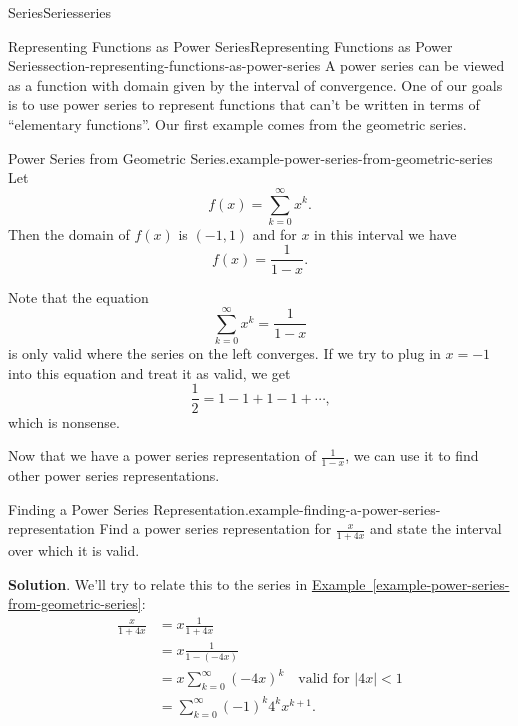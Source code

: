 \documentclass[oneside,10pt,]{book}
\numberwithin{equation}{section}
\newcommand{\lt}{<}
\newcommand{\amp}{&}
\begin{document}
\begin{chapterptx}{Series}{}{Series}{}{}{series}
\begin{sectionptx}{Representing Functions as Power Series}{}{Representing Functions as Power Series}{}{}{section-representing-functions-as-power-series}
\hypertarget{p-948}{}%
A power series can be viewed as a function with domain given by the interval of convergence. One of our goals is to use power series to represent functions that can't be written in terms of ``elementary functions''. Our first example comes from the geometric series.%
\begin{example}{Power Series from Geometric Series.}{example-power-series-from-geometric-series}%
\hypertarget{p-949}{}%
Let%
\begin{equation*}
f(x) = \sum_{k = 0}^{\infty} x^{k}\text{.}
\end{equation*}
Then the domain of \(f(x)\) is \((-1,1)\) and for \(x\) in this interval we have%
\begin{equation*}
f(x) = \frac{1}{1 - x}\text{.}
\end{equation*}
%
\end{example}
\hypertarget{p-950}{}%
Note that the equation%
\begin{equation*}
\sum_{k=0}^{\infty}x^{k} = \frac{1}{1 - x}
\end{equation*}
is only valid where the series on the left converges. If we try to plug in \(x = -1\) into this equation and treat it as valid, we get%
\begin{equation*}
\frac{1}{2} = 1 - 1 + 1 - 1 + \cdots\text{,}
\end{equation*}
which is nonsense.%
\par
\hypertarget{p-951}{}%
Now that we have a power series representation of \(\frac{1}{1 - x}\), we can use it to find other power series representations.%
\begin{example}{Finding a Power Series Representation.}{example-finding-a-power-series-representation}%
\hypertarget{p-952}{}%
Find a power series representation for \(\displaystyle\frac{x}{1 + 4x}\) and state the interval over which it is valid.%
\par\smallskip%
\noindent\textbf{Solution}.\hypertarget{solution-193}{}\quad%
\hypertarget{p-953}{}%
We'll try to relate this to the series in \hyperref[example-power-series-from-geometric-series]{Example~\ref{example-power-series-from-geometric-series}}:%
\begin{align*}
\frac{x}{1 + 4x} \amp = x \frac{1}{1 + 4x} \\
\amp = x \frac{1}{1 - (-4x)} \\
\amp = x \sum_{k=0}^{\infty}(-4x)^{k} \quad\text{valid for }|4x| \lt 1 \\
\amp = \sum_{k=0}^{\infty} (-1)^{k}4^{k}x^{k+1} \text{.}
\end{align*}

\end{example}
\end{sectionptx}
\end{chapterptx}
\end{document}
